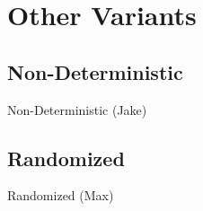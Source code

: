 \documentclass{beamer}
\begin{document}
\section{Other Variants}

\subsection{Non-Deterministic}

\begin{frame}{Non-Deterministic (Jake)}
\TODO
\end{frame}

\subsection{Randomized}

\begin{frame}{Randomized (Max)}
\TODO
\end{frame}
\end{document}
